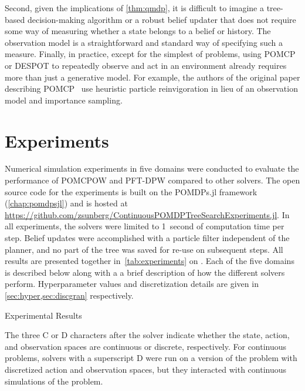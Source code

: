 Second, given the implications of \cref{thm:qmdp}, it is difficult to imagine a tree-based decision-making algorithm or a robust belief updater that does not require some way of measuring whether a state belongs to a belief or history.
The observation model is a straightforward and standard way of specifying such a measure.
Finally, in practice, except for the simplest of problems, using POMCP or DESPOT to repeatedly observe and act in an environment already requires more than just a generative model.
For example, the authors of the original paper describing POMCP~\cite{silver2010pomcp} use heuristic particle reinvigoration in lieu of an observation model and importance sampling.

\section{Experiments} \label{sec:experiments}

Numerical simulation experiments in five domains were conducted to evaluate the performance of POMCPOW and PFT-DPW compared to other solvers.
The open source code for the experiments is built on the POMDPs.jl framework (\cref{chap:pomdpsjl}) and is hosted at \url{https://github.com/zsunberg/ContinuousPOMDPTreeSearchExperiments.jl}.
In all experiments, the solvers were limited to \SI{1}{second} of computation time per step.
Belief updates were accomplished with a particle filter independent of the planner, and no part of the tree was saved for re-use on subsequent steps.
All results are presented together in~\cref{tab:experiments} on .
Each of the five domains is described below along with a a brief description of how the different solvers perform.
Hyperparameter values and discretization details are given in \cref{sec:hyper,sec:discgran} respectively.

\begin{table}
    {
        \caption{Experimental Results} \label{tab:experiments}

        
    }
    \vspace{5mm}
    \footnotesize{The three C or D characters after the solver indicate whether the state, action, and observation spaces are continuous or discrete, respectively. For continuous problems, solvers with a superscript D were run on a version of the problem with discretized action and observation spaces, but they interacted with continuous simulations of the problem.}
\end{table}


